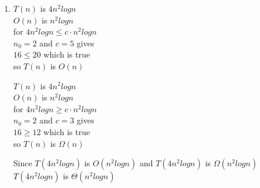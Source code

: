 \documentclass[11pt]{article}
\begin{document}
\begin{enumerate}[label=(\arabic*)\setlength{\listparindent}{\parindent}]
\pagebreak

      \item 
$T(n)$ is $4n^2 logn$\\
\vspace{5pt}
$O(n)$ is $n^2logn$\\
\vspace{5pt} 
for $ 4n^2 logn\leq c \cdot n^2logn$\\
\vspace{5pt}
 $n_{0} = 2$ and $c = 5$ gives  \\
\vspace{5pt} 
$16 \leq 20$ which is true \\
\vspace{5pt} 
so $T(n)$ is $O(n)$\\
\begin{center}
\vspace{-130pt}
$T(n)$ is $4n^2 logn$\\
\vspace{5pt}
$O(n)$ is $n^2logn$\\
\vspace{5pt} 
for $ 4n^2 logn\geq c \cdot n^2logn$\\
\vspace{5pt}
$n_{0} = 2$ and $c = 3$ gives  \\
\vspace{5pt} 
$16 \geq 12$ which is true \\
\vspace{5pt} 
so $T(n)$ is $\Omega(n)$
\end{center}
Since $T(4n^2 logn)$ is $O(n^2logn)$ and $T(4n^2 logn)$ is $\Omega(n^2logn)$ \\
\vspace{5pt}
$T(4n^2 logn)$ is $\Theta(n^2logn)$


      \end{enumerate}
\end{document}
